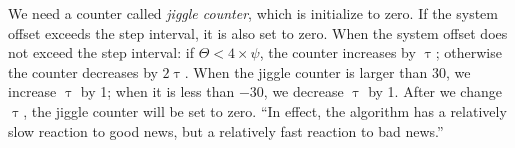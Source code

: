 We need a counter called \emph{jiggle counter}, which is initialize to zero. If
the system offset exceeds the step interval, it is also set to zero. When the
system offset does not exceed the step interval:
if $\Theta < 4 \times \psi$, the counter increases by $\uptau$; 
otherwise the counter decreases by $2\uptau$.
When the jiggle counter is larger than 30, we increase $\uptau$ by 1; when it
is less than $-30$, we decrease $\uptau$ by 1. After we change $\uptau$, the
jiggle counter will be set to zero. ``In effect, the algorithm has a relatively
slow reaction to good news, but a relatively fast reaction to bad
news.''~\cite{poll_process}



